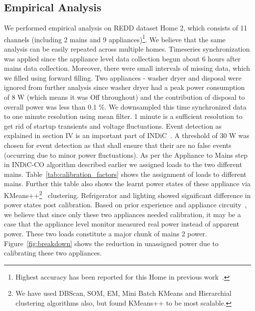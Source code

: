 \documentclass[conference]{IEEEtran}
\newcommand{\figref}[1]{Figure~\ref{#1}}
\newcommand{\tabref}[1]{Table~\ref{#1}}
\newcommand{\indic}{INDiC~}
\newcommand{\indicns}{INDiC}
\begin{document}
\subsection{Empirical Analysis}
\noindent We performed empirical analysis on REDD dataset Home 2, which consists of 11 channels (including 2 mains and 9 appliances)\footnote{Highest accuracy has been reported for this Home in previous work~\cite{redd}.}. We believe that the same analysis can be easily repeated across multiple homes. Timeseries synchronization was applied since the appliance level data collection begun about 6 hours after mains data collection. Moreover, there were small intervals of missing data, which we filled using forward filling. Two appliances - washer dryer and disposal were ignored from further analysis since washer dryer had a peak power consumption of 8 W (which means it was Off throughout) and the contribution of disposal to overall power was less than 0.1 \%.  We downsampled this time synchronized data to one minute resolution using mean filter. 1 minute is a sufficient resolution to get rid of startup transients and voltage fluctuations. Event detection as explained in section IV is an important part of \indic. A threshold of 30 W was chosen for event detection as that shall ensure that their are no false events (occurring due to minor power fluctuations). As per the Appliance to Mains step in \indicns-CO algorithm described earlier we assigned loads to the two different mains.  \tabref{tab:calibration_factors} shows the assignment of loads to different mains. Further this table also shows the learnt power states of these appliance via KMeans++\footnote{We have used DBScan, SOM, EM, Mini Batch KMeans and Hierarchial clustering algorithms also, but found KMeans++ to be most scalable.}~\cite{kmeansplusplus} clustering. Refrigerator and lighting showed significant difference in power states post calibration. Based on prior experience and appliance circuity~\cite{ting2005}, we believe that since only these two appliances needed calibration, it may be a case that the appliance level monitor measured real power instead of apparent power. These two loads constitute a major chunk of mains 2 power. \figref{fig:breakdown} shows the reduction in unassigned power due to calibrating these two appliances. 
\end{document}
